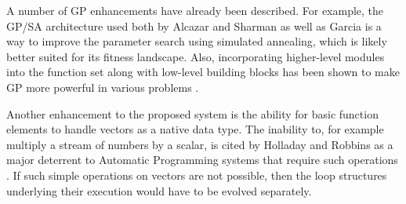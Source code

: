 \documentclass[a4paper,12pt]{report} 	%
\numberwithin{figure}{chapter}
\numberwithin{table}{chapter}
\numberwithin{equation}{chapter}
\begin{document}
\begin{flushleft}
A number of GP enhancements have already been described. For example, the GP/SA architecture used both by Alcazar and Sharman \cite{Alcazar:1996la} as well as Garcia \cite{Garcia:2002cq} is a way to improve the parameter search using simulated annealing, which is likely better suited for its fitness landscape. Also, incorporating higher-level modules into the function set along with low-level building blocks has been shown to make GP more powerful in various problems \cite{Koza:1997zr}. 

Another enhancement to the proposed system is the ability for basic function elements to handle vectors as a native data type. The inability to, for example multiply a stream of numbers by a scalar, is cited by Holladay and Robbins as a major deterrent to Automatic Programming systems that require such operations \cite[p. 1]{Holladay:2007ct}. If such simple operations on vectors are not possible, then the loop structures underlying their execution would have to be evolved separately.


\end{flushleft}
\end{document}
